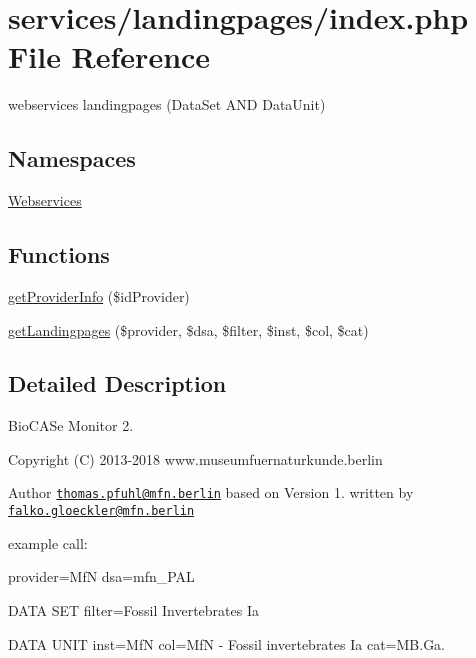 \hypertarget{services_2landingpages_2index_8php}{}\section{services/landingpages/index.php File Reference}
\label{services_2landingpages_2index_8php}


webservices landingpages (Data\+Set A\+ND Data\+Unit)  


\subsection*{Namespaces}
\begin{DoxyCompactItemize}
\item 
 \hyperlink{namespace_webservices}{Webservices}
\end{DoxyCompactItemize}
\subsection*{Functions}
\begin{DoxyCompactItemize}
\item 
\hyperlink{namespace_webservices_a56703e6dd42e07b8734efeb0f2f7bd88}{get\+Provider\+Info} (\$id\+Provider)
\item 
\hyperlink{namespace_webservices_ad27d0dcb2a954ed5890f6c44c37e3d80}{get\+Landingpages} (\$provider, \$dsa, \$filter, \$inst, \$col, \$cat)
\end{DoxyCompactItemize}


\subsection{Detailed Description}
Bio\+C\+A\+Se Monitor 2. \begin{DoxyCopyright}{Copyright}
(C) 2013-\/2018 www.\+museumfuernaturkunde.\+berlin 
\end{DoxyCopyright}
\begin{DoxyAuthor}{Author}
\href{mailto:thomas.pfuhl@mfn.berlin}{\tt thomas.\+pfuhl@mfn.\+berlin} based on Version 1. written by \href{mailto:falko.gloeckler@mfn.berlin}{\tt falko.\+gloeckler@mfn.\+berlin}
\end{DoxyAuthor}
example call\+:

provider=MfN dsa=mfn\+\_\+\+P\+AL

D\+A\+TA S\+ET filter=Fossil Invertebrates Ia

D\+A\+TA U\+N\+IT inst=MfN col=MfN -\/ Fossil invertebrates Ia cat=M\+B.\+Ga.

